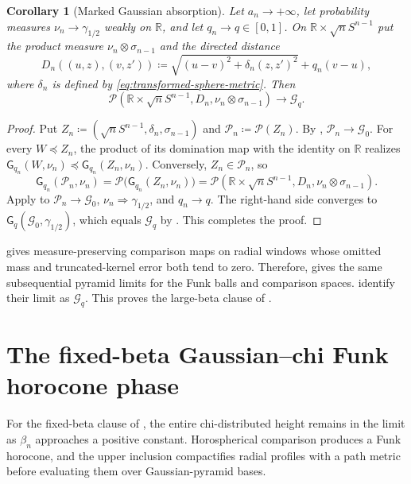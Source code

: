 \documentclass[10pt,a4paper]{amsart}
\numberwithin{equation}{section}
\newtheorem{corollary}[theorem]{Corollary}
\newcommand{\R}{\mathbb R}
\newcommand{\Pyr}{\mathcal P}
\begin{document}
\begin{corollary}[Marked Gaussian absorption]\label{thm:marked-gaussian-absorption}
Let $a_n\to+\infty$, let probability measures $\nu_n\longrightarrow\gamma_{1/2}$ weakly on $\R$, and let $q_n\to q\in[0,1]$.  On $\R\times\sqrt nS^{n-1}$ put the product measure $\nu_n\otimes\sigma_{n-1}$ and the directed distance
\begin{equation}\label{eq:marked-comparison-distance} D_n((u,z),(v,z')) \coloneqq\sqrt{(u-v)^2+\delta_n(z,z')^2}+q_n(v-u), \end{equation}
where $\delta_n$ is defined by \eqref{eq:transformed-sphere-metric}.  Then
\[ \Pyr(\R\times\sqrt nS^{n-1},D_n, \nu_n\otimes\sigma_{n-1}) \longrightarrow\mathcal G_q. \]
\end{corollary}

\begin{proof}
Put $Z_n\coloneqq(\sqrt nS^{n-1},\delta_n,\sigma_{n-1})$ and
$\mathcal P_n\coloneqq\Pyr(Z_n)$.  By ,
$\mathcal P_n\to\mathcal G_0$.  For every $W\preceq Z_n$, the product of its domination map with the identity on $\R$
realizes
$\mathsf G_{q_n}(W,\nu_n)\preceq\mathsf G_{q_n}(Z_n,\nu_n)$.  Conversely, $Z_n\in\mathcal P_n$, so
\[
 \mathsf G_{q_n}(\mathcal P_n,\nu_n)
 =\Pyr\bigl(\mathsf G_{q_n}(Z_n,\nu_n)\bigr)
 =\Pyr(\R\times\sqrt nS^{n-1},D_n,\nu_n\otimes\sigma_{n-1}).
\]
Apply  to
$\mathcal P_n\to\mathcal G_0$, $\nu_n\Rightarrow\gamma_{1/2}$, and $q_n\to q$.  The right-hand side converges to
$\mathsf G_q(\mathcal G_0,\gamma_{1/2})$, which equals $\mathcal G_q$ by
.  This completes the proof.
\end{proof}

 gives measure-preserving comparison maps on radial windows whose omitted mass and truncated-kernel error both tend to zero.  Therefore,  gives the same subsequential pyramid limits for the Funk balls and comparison spaces.   identify their limit as $\mathcal G_q$.
This proves the large-beta clause of .

\section{The fixed-beta Gaussian--chi Funk horocone phase}\label{sec:fixed-beta}

For the fixed-beta clause of , the entire chi-distributed height remains in the limit as $\beta_n$ approaches a positive constant.  Horospherical comparison produces a Funk horocone, and the upper inclusion compactifies radial profiles with a path metric before evaluating them over Gaussian-pyramid bases.
\end{document}
